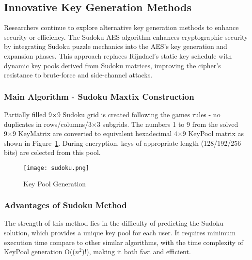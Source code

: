 \subsection{Innovative Key Generation Methods}

Researchers continue to explore alternative key generation methods to enhance security or efficiency. 
The Sudoku-AES algorithm enhances cryptographic security by integrating Sudoku puzzle mechanics into 
the AES's key generation and expansion phases. This approach replaces Rijndael's static key schedule 
with dynamic key pools derived from Sudoku matrices, improving the cipher's resistance  to 
brute-force and side-channel attacks. \cite{Sudoku_Method}

\subsubsection{Main Algorithm - Sudoku Maxtix Construction}

Partially filled 9×9 Sudoku grid is created following the 
games rules - no duplicates in rows/columns/3×3 subgrids. The numbers 1 to 9 from the solved 9×9 KeyMatrix 
are converted to equivalent hexadecimal 4×9 KeyPool matrix as shown in Figure~\ref{fig:sudoku}. During encryption, 
keys of appropriate length (128/192/256 bits) are celected from this pool. \cite{Sudoku_Method}

\begin{figure}[h] %
    \centering
    \texttt{[image: sudoku.png]} %
    \caption{
        Key Pool Generation \cite{Sudoku_Method}
    }
    \label{fig:sudoku} %
\end{figure}

\subsubsection{Advantages of Sudoku Method}

The strength of this method lies in the difficulty of predicting the Sudoku solution, which provides 
a unique key pool for each user. It requires minimum execution time compare to other similar algorithms, 
with the time complexity of KeyPool generation O(($n^2$)!), making it both fast and efficient. \cite{Sudoku_Method} 
